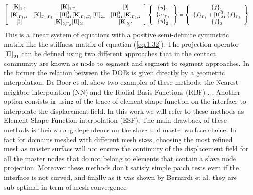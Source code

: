  \begin{equation}
  \label{eq.33}
  \begin{aligned}
  \left[ \begin{array}{ccc} 
      \left[{\mathbf{K}}\right]_{1,1} & \left[{\mathbf{K}}\right]_{1,\Gamma_1} & \left[{0}\right] \\
     \left[{\mathbf{K}}\right]_{\Gamma_1,1} & \left[{\mathbf{K}}\right]_{\Gamma_1,\Gamma_1}+ \left[{\Pi}\right]_{21}^T\left[{\mathbf{K}}\right]_{\Gamma_2,\Gamma_2}\left[{\Pi}\right]_{21} & \left[{\Pi}\right]_{21}^T\left[{\mathbf{K}}\right]_{\Gamma_2,2}\\   
      \left[{0}\right] & \left[{\mathbf{K}}\right]_{2,\Gamma_2}\left[{\Pi}\right]_{21} & \left[{\mathbf{K}}\right]_{2,2}\end{array} \right] \left\lbrace \begin{array}{c} \left\lbrace{u}\right \rbrace_1\\\left\lbrace{u}\right \rbrace_{\Gamma_1}\\\left\lbrace{u}\right \rbrace_2
      \end{array}\right\rbrace= \left\lbrace\begin{array}{c} \left\lbrace{f}\right \rbrace_1\\\left\lbrace{f}\right \rbrace_{\Gamma_1}+\left[{\Pi}\right]_{21}^T\left\lbrace{f}\right \rbrace_{\Gamma_2}\\\left\lbrace{f}\right \rbrace_2
      \end{array}\right\rbrace
  \end{aligned}
  \end{equation}
  This is a linear system of equations with a positive semi-definite symmetric matrix like the stiffness matrix of equation (\ref{eq.1.32}). 
  The projection operator $\left[{\Pi}\right]_{21}$ can be defined using two different approaches that in the contact community are known as node to segment and segment to segment approaches. In the former the relation between the DOFs is given directly by a geometric interpolation. De Boer et al. \cite{de2007review} show two examples of these methods: the Nearest neighbor interpolation (NN) \cite{thevenaz2000interpolation} and the Radial Basis Functions (RBF) \cite{beckert2001multivariate}, \cite{smith2000evaluation}. Another option consists in using of the trace of element shape function on the interface to interpolate the displacement field. In this work we will refer to these methods as Element Shape Function interpolation (ESF).
  The main drawback of these methods is their strong dependence on the slave and master surface choice. In fact for domains meshed with different mesh sizes, choosing the most refined mesh as master surface will not ensure the continuity of the displacement field for all the master nodes that do not belong to elements that contain a slave node projection. Moreover these methods don't satisfy simple patch tests even if the interface is not curved, and finally as it was shown by Bernardi et al. \cite{bernardi1989new} they are sub-optimal in term of mesh convergence.
